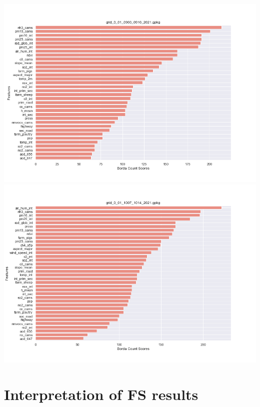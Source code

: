 \begin{center}
\includegraphics[width=.9\textwidth]{images/fs_results/nh3/001/no_montains/grid_0_01_0903_0910_2021.png}
\includegraphics[width=.9\textwidth]{images/fs_results/nh3/001/no_montains/grid_0_01_1007_1014_2021.png}
\end{center}
\section{Interpretation of FS results}

